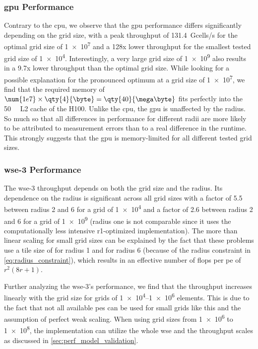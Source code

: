 \subsubsection{\ac{gpu} Performance}
Contrary to the \ac{cpu}, we observe that the \ac{gpu} performance differs significantly depending on the grid size, with a peak throughput of \qty{131.4}{Gcells/s} for the optimal grid size of \num{1e7} and a 128x lower throughput for the smallest tested grid size of \num{1e4}. Interestingly, a very large grid size of \num{1e9} also results in a 9.7x lower throughput than the optimal grid size. While looking for a possible explanation for the pronounced optimum at a grid size of \num{1e7}, we find that the required memory of $\num{1e7} \times \qty{4}{\byte} = \qty{40}{\mega\byte}$ fits perfectly into the \qty{50}{\mega\byte} L2 cache of the H100.
Unlike the \ac{cpu}, the \ac{gpu} is unaffected by the radius. So much so that all differences in performance for different radii are more likely to be attributed to measurement errors than to a real difference in the runtime. This strongly suggests that the \ac{gpu} is memory-limited for all different tested grid sizes.

\subsubsection{\ac{wse}-3 Performance}
The \ac{wse}-3 throughput depends on both the grid size and the radius. Its dependence on the radius is significant across all grid sizes with a factor of \num{5.5} between radius \num{2} and \num{6} for a grid of \num{1e4} and a factor of \num{2.6} between radius \num{2} and \num{6} for a grid of \num{1e9} (radius one is not comparable since it uses the computationally less intensive r1-optimized implementation).
The more than linear scaling for small grid sizes can be explained by the fact that these problems use a tile size of  for radius \num{1} and  for radius \num{6} (because of the radius constraint in \autoref{eq:radius_constraint}), which results in an effective number of \acp{flop} per \ac{pe} of $r^2(8r+1)$.

Further analyzing the \ac{wse}-3's performance, we find that the throughput increases linearly with the grid size for grids of \numrange{1e4}{1e6} elements. This is due to the fact that not all available \acp{pe} can be used for small grids like this and the assumption of perfect weak scaling. When using grid sizes from \num{1e6} to \num{1e8}, the implementation can utilize the whole \ac{wse} and the throughput scales as discussed in \autoref{sec:perf_model_validation}.

